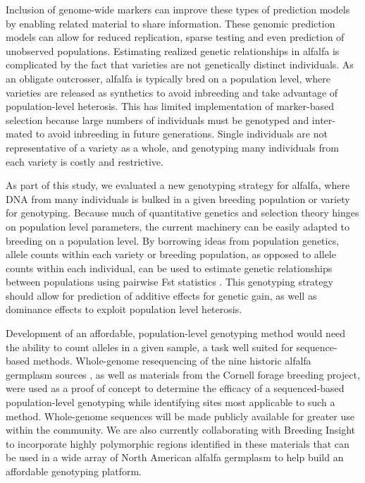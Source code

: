 \documentclass[12pt, letterpaper]{article}
\begin{document}
Inclusion of genome-wide markers can improve these types of prediction models by enabling related material to share information. These genomic prediction models can allow for reduced replication, sparse testing and even prediction of unobserved populations. Estimating realized genetic relationships in alfalfa is complicated by the fact that varieties are not genetically distinct individuals. As an obligate outcrosser, alfalfa is typically bred on a population level, where varieties are released as synthetics to avoid inbreeding and take advantage of population-level heterosis. This has limited implementation of marker-based selection because large numbers of individuals must be genotyped and inter-mated to avoid inbreeding in future generations. Single individuals are not representative of a variety as a whole, and genotyping many individuals from each variety is costly and restrictive. 

As part of this study, we evaluated a new genotyping strategy for alfalfa, where DNA from many individuals is bulked in a given breeding population or variety for genotyping. Because much of quantitative genetics and selection theory hinges on population level parameters, the current machinery can be easily adapted to breeding on a population level. By borrowing ideas from population genetics, allele counts within each variety or breeding population, as opposed to allele counts within each individual, can be used to estimate genetic relationships between populations using pairwise Fst statistics \parencite{weir2002}. This genotyping strategy should allow for prediction of additive effects for genetic gain, as well as dominance effects to exploit population level heterosis. 

Development of an affordable, population-level genotyping method would need the ability to count alleles in a given sample, a task well suited for sequence-based methods. Whole-genome resequencing of the nine historic alfalfa germplasm sources \parencite{barnes1977, segovia2004}, as well as materials from the Cornell forage breeding project, were used as a proof of concept to determine the efficacy of a sequenced-based population-level genotyping while identifying sites most applicable to such a method. Whole-genome sequences will be made publicly available for greater use within the community. We are also currently collaborating with Breeding Insight to incorporate highly polymorphic regions identified in these materials that can be used in a wide array of North American alfalfa germplasm to help build an affordable genotyping platform. 
\end{document}
